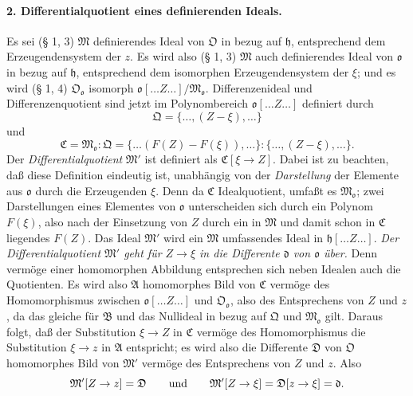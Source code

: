 \paragraph{2. Differentialquotient eines definierenden Ideals.}
Es sei (§ 1, 3) $\mathfrak M$ definierendes Ideal von $\mathfrak O$ in bezug auf $\mathfrak h$, entsprechend dem Erzeugendensystem der $z$. Es wird also (§ 1, 3) $\mathfrak M$ auch definierendes Ideal von $\mathfrak o$ in bezug auf $\mathfrak h$, entsprechend dem isomorphen Erzeugendensystem der $\xi$; und es wird (§ 1, 4) $\mathfrak O_{\mathfrak o}$ isomorph $\mathfrak o[\ldots Z\ldots]/\mathfrak M_{\mathfrak o}$. Differenzenideal und Differenzenquotient sind jetzt im Polynombereich $\mathfrak o[\ldots Z\ldots]$ definiert durch
\[
\mathfrak Q=\{\ldots,(Z-\xi),\ldots\}
\]
und
\[
\mathfrak C=\mathfrak M_{\mathfrak o}:\mathfrak Q
=\{\ldots(F(Z)-F(\xi)),\ldots\}:\{\ldots,(Z-\xi),\ldots\}.
\]
Der \emph{Differentialquotient} $\mathfrak M'$ ist definiert als $\mathfrak C[\xi\to Z]$. Dabei ist zu beachten, daß diese Definition eindeutig ist, unabhängig von der \emph{Darstellung} der Elemente aus $\mathfrak o$ durch die Erzeugenden $\xi$. Denn da $\mathfrak C$ Idealquotient, umfaßt es $\mathfrak M_{\mathfrak o}$; zwei Darstellungen eines Elementes von $\mathfrak o$ unterscheiden sich durch ein Polynom $F(\xi)$, also nach der Einsetzung von $Z$ durch ein in $\mathfrak M$ und damit schon in $\mathfrak C$ liegendes $F(Z)$. Das Ideal $\mathfrak M'$ wird ein $\mathfrak M$ umfassendes Ideal in $\mathfrak h[\ldots Z\ldots]$. \emph{Der Differentialquotient $\mathfrak M'$ geht für $Z\to\xi$ in die Differente $\mathfrak d$ von $\mathfrak o$ über.} Denn vermöge einer homomorphen Abbildung entsprechen sich neben Idealen auch die Quotienten. Es wird also $\mathfrak A$ homomorphes Bild von $\mathfrak C$ vermöge des Homomorphismus zwischen $\mathfrak o[\ldots Z\ldots]$ und $\mathfrak O_{\mathfrak o}$, also des Entsprechens von $Z$ und $z$, da das gleiche für $\mathfrak B$ und das Nullideal in bezug auf $\mathfrak Q$ und $\mathfrak M_{\mathfrak o}$ gilt. Daraus folgt, daß der Substitution $\xi\to Z$ in $\mathfrak C$ vermöge des Homomorphismus die Substitution $\xi\to z$ in $\mathfrak A$ entspricht; es wird also die Differente $\mathfrak D$ von $\mathfrak O$ homomorphes Bild von $\mathfrak M'$ vermöge des Entsprechens von $Z$ und $z$. Also
\[
\mathfrak M'[Z\to z]=\mathfrak D
\qquad\hbox{und}\qquad
\mathfrak M'[Z\to\xi]=\mathfrak D[z\to\xi]=\mathfrak d.
\]

